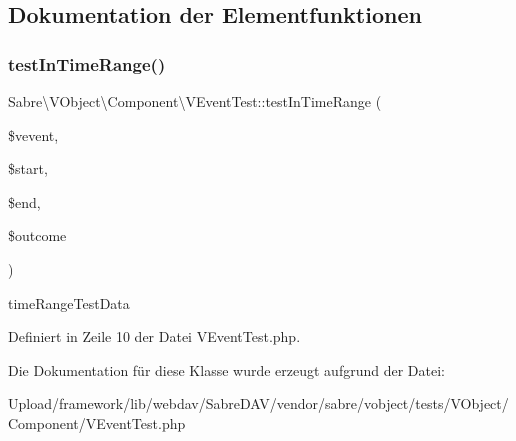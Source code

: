 \subsection{Dokumentation der Elementfunktionen}
\mbox{\label{class_sabre_1_1_v_object_1_1_component_1_1_v_event_test_ae8d9f453093143fb337f975e0d26b812}} 
\subsubsection{\texorpdfstring{test\+In\+Time\+Range()}{testInTimeRange()}}
{\footnotesize\ttfamily Sabre\textbackslash{}\+V\+Object\textbackslash{}\+Component\textbackslash{}\+V\+Event\+Test\+::test\+In\+Time\+Range (\begin{DoxyParamCaption}\item[{\mbox{\hyperlink{class_sabre_1_1_v_object_1_1_component_1_1_v_event}{V\+Event}}}]{\$vevent,  }\item[{}]{\$start,  }\item[{}]{\$end,  }\item[{}]{\$outcome }\end{DoxyParamCaption})}

time\+Range\+Test\+Data 

Definiert in Zeile 10 der Datei V\+Event\+Test.\+php.



Die Dokumentation für diese Klasse wurde erzeugt aufgrund der Datei\+:\begin{DoxyCompactItemize}
\item 
Upload/framework/lib/webdav/\+Sabre\+D\+A\+V/vendor/sabre/vobject/tests/\+V\+Object/\+Component/V\+Event\+Test.\+php\end{DoxyCompactItemize}
